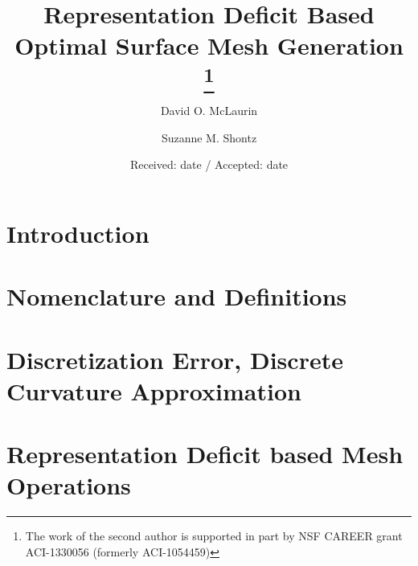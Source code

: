 \documentclass[smallextended]{svjour3}       %
\begin{document}
\title{Representation Deficit Based Optimal Surface Mesh Generation
\thanks{The work of the second author is supported in part by NSF CAREER grant ACI-1330056 (formerly ACI-1054459)}
}

\author{
  David O. McLaurin \and
  Suzanne M. Shontz
}



\date{Received: date / Accepted: date}

\maketitle

\begin{abstract}

\end{abstract}

\section{Introduction}


\section{Nomenclature and Definitions}


\section{Discretization Error, Discrete Curvature Approximation}


\section{Representation Deficit based Mesh Operations}

\end{document}
